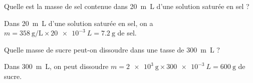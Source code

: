 
\begin{enonce}
Quelle est la masse de sel contenue dans \SI{20}{m\liter} d'une solution saturée en sel ?

\end{enonce}


\begin{corrige}
Dans \SI{20}{m\liter} d'une solution saturée en sel, on a $m=\SI{358}{\gram\per\liter} \times \SI{20e-3}{L}=\SI{7,2}{\gram}$ de sel.
\end{corrige}


\begin{enonce}
Quelle masse de sucre peut-on dissoudre dans une tasse de \SI{300}{m\liter} ?

\end{enonce}


\begin{corrige}
Dans \SI{300}{m\liter}, on peut dissoudre $m=\SI{2e3}{\gram}\times\SI{300e-3}{L}=\SI{600}{\gram}$ de sucre.
\end{corrige}


\finEntrainement







\hauteurLargeurCadreReponse		{7mm}{5cm}
\typeEntrainement				{} %
\initialisationEntrainement


